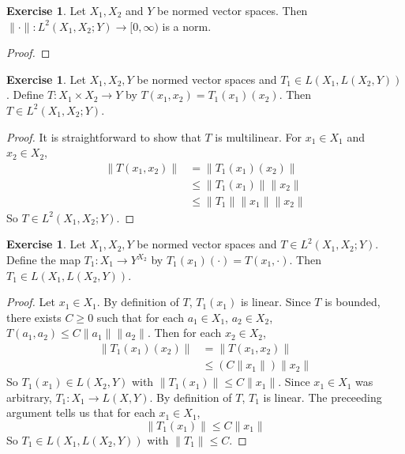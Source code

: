 \documentclass[12pt]{amsart}
\theoremstyle{definition}
\newtheorem{ex}[definition]{Exercise}
\DeclareMathOperator*{\0}{\mbf{0}}
\DeclareMathOperator*{\1}{\mbf{1}}
\newcommand{\lex}[1]{\label{ex:#1}}
\begin{document}
	\begin{ex}
	Let $X_1, X_2$ and $Y$ be normed vector spaces. Then $\|\cdot\|: L^2(X_1, X_2; Y) \rightarrow [0, \infty)$ is a norm. 
	\end{ex}
	
	\begin{proof}
	
	\end{proof}
	
	\begin{ex} \lex{43003}
	Let $X_1, X_2, Y$ be normed vector spaces and $T_1 \in L(X_1, L(X_2, Y))$. Define $T:X_1 \times X_2 \rightarrow Y$ by $T(x_1, x_2) = T_1(x_1)(x_2)$. Then $T \in L^2(X_1, X_2; Y)$.  
	\end{ex}
	
	\begin{proof}
	It is straightforward to show that $T$ is multilinear. For $x_1 \in X_1$ and $x_2 \in X_2$, 
	\begin{align*}
	\|T(x_1, x_2)\| 
	&= \|T_1(x_1)(x_2)\| \\
	& \leq \|T_1(x_1)\| \|x_2\| \\
	& \leq \|T_1\| \|x_1\| \|x_2\|
	\end{align*}
	So $T \in L^2(X_1, X_2;Y)$.
	\end{proof}
	
	\begin{ex} \lex{43004}
	Let $X_1, X_2, Y$ be normed vector spaces and $T \in L^2(X_1, X_2; Y)$. Define the map $T_1 : X_1 \rightarrow  Y^{X_2}$ by  $T_1(x_1)(\cdot) = T(x_1, \cdot)$. Then $T_1 \in L(X_1, L(X_2, Y))$.
	\end{ex}
	
	\begin{proof}
	Let $x_1 \in X_1$. By definition of $T$, $T_1(x_1)$ is linear. Since $T$ is bounded, there exists $C \geq 0$ such that for each $a_1 \in X_1$, $a_2 \in X_2$, $T(a_1, a_2) \leq C\|a_1\| \|a_2\|$. Then for each $x_2 \in X_2$,
	\begin{align*}
	\| T_1(x_1)(x_2) \|
	&= \|T(x_1, x_2) \| \\
	&\leq (C\|x_1\|) \|x_2\| 
	\end{align*}
	So $T_1(x_1) \in L(X_2,Y)$ with $\|T_1(x_1)\| \leq C\|x_1\|$. Since $x_1 \in X_1$ was arbitrary, $T_1: X_1 \rightarrow L(X,Y)$. By definition of $T$, $T_1$ is linear. The preceeding argument tells us that for each $x_1 \in X_1$, $$\|T_1(x_1)\| \leq C\|x_1\|$$ 
	So $T_1 \in L(X_1, L(X_2, Y))$ with $\|T_1\| \leq C$.  
	\end{proof}	
	
\end{document}
